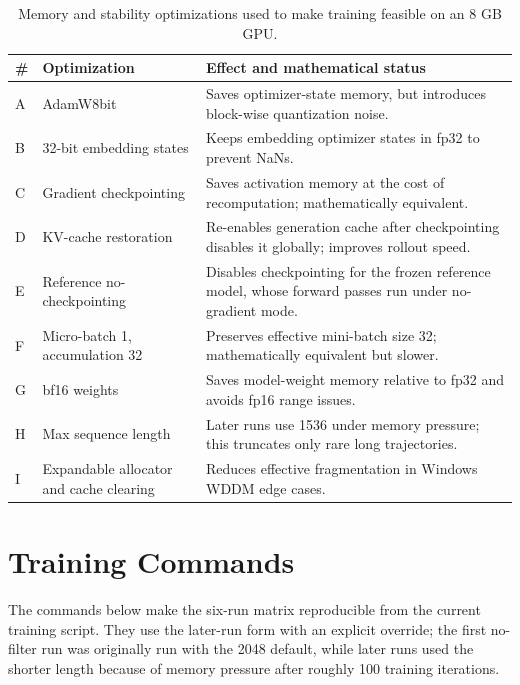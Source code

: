 \begin{table}[!htbp]
\centering
\small
\begin{tabularx}{\textwidth}{llX}
\toprule
\# & Optimization & Effect and mathematical status \\
\midrule
A & AdamW8bit & Saves optimizer-state memory, but introduces block-wise quantization noise. \\
B & 32-bit embedding states & Keeps embedding optimizer states in fp32 to prevent NaNs. \\
C & Gradient checkpointing & Saves activation memory at the cost of recomputation; mathematically equivalent. \\
D & KV-cache restoration & Re-enables generation cache after checkpointing disables it globally; improves rollout speed. \\
E & Reference no-checkpointing & Disables checkpointing for the frozen reference model, whose forward passes run under no-gradient mode. \\
F & Micro-batch 1, accumulation 32 & Preserves effective mini-batch size 32; mathematically equivalent but slower. \\
G & bf16 weights & Saves model-weight memory relative to fp32 and avoids fp16 range issues. \\
H & Max sequence length & Later runs use 1536 under memory pressure; this truncates only rare long trajectories. \\
I & Expandable allocator and cache clearing & Reduces effective fragmentation in Windows WDDM edge cases. \\
\bottomrule
\end{tabularx}
\caption{Memory and stability optimizations used to make training feasible on an 8 GB GPU.}
\label{tab:app_memory}
\end{table}

\clearpage
\section{Training Commands}
\label{sec:commands}

The commands below make the six-run matrix reproducible from the current training script. They use the later-run form with an explicit  override; the first no-filter run was originally run with the 2048 default, while later runs used the shorter length because of memory pressure after roughly 100 training iterations.

